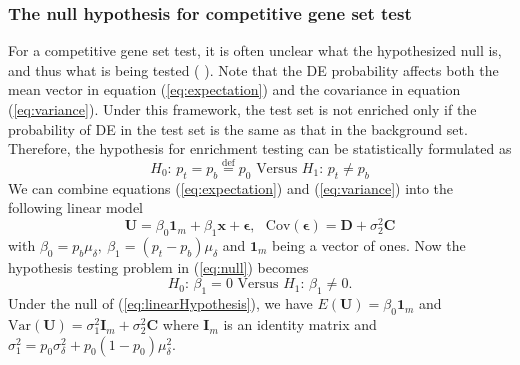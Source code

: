 \documentclass[useAMS,usenatbib, galley]{biom}
\begin{document}
	\subsubsection*{The null hypothesis for competitive gene set test}\label{subsubsection:nullhypothesis}
	For a competitive gene set test, it is often unclear what the hypothesized null is, and thus what is being tested (\cite{barry2008statistical}  \citealp{wu2012camera}). Note that the DE probability affects both the mean vector in equation (\ref{eq:expectation}) and the covariance in equation (\ref{eq:variance}). Under this framework, the test set is not enriched only if the probability of DE in the test set is the same as that in the background set. Therefore, the hypothesis for enrichment testing can be statistically formulated as
	\begin{equation}\label{eq:null}
	H_0\text{: }  p_t = p_b \stackrel{\text{def}}{=}p_0  \text{ Versus } H_1 \text{: } p_t \neq p_b
	\end{equation}
	We can combine equations (\ref{eq:expectation}) and (\ref{eq:variance}) into the following linear model
	\begin{equation}\label{eq:linearModel}
	\bm U = \beta_0\bm 1_m + \beta_1\bm x + \bm \epsilon, \text{~~Cov}(\bm \epsilon) =  \bm D  + \sigma_2^2\bm C
	\end{equation} 
	with $ \beta_0 = p_b\mu_{\delta}, ~\beta_1 = (p_t-p_b)\mu_{\delta}$ and $\bm 1_m$ being a vector of ones. Now the hypothesis testing problem in (\ref{eq:null}) becomes 
	\begin{equation}\label{eq:linearHypothesis}
	H_0\text{: }  \beta_1 = 0   \text{ Versus } H_1 \text{: } \beta_1 \neq 0.
	\end{equation}
	Under the null of (\ref{eq:linearHypothesis}), we have $E(\bm U) = \beta_0\bm 1_m$ and $\text{Var}(\bm U) = \sigma^2_1\bm I_m + \sigma_2^2 \bm C$ where $\bm I_m$ is an identity matrix and $\sigma_1^2 = p_0\sigma^2_{\delta}+ p_0(1-p_0)\mu^2_{\delta}$.
	
\end{document}
